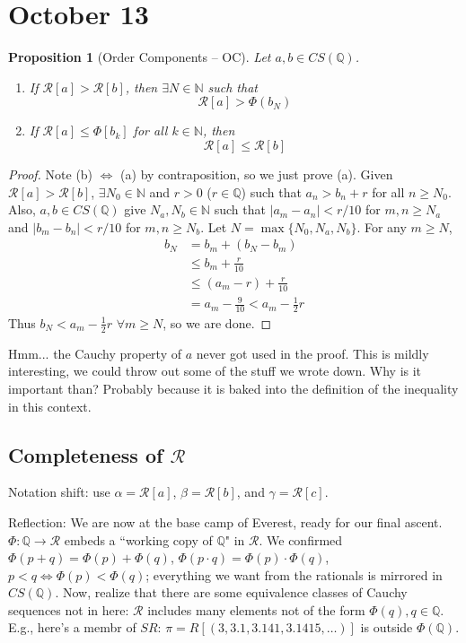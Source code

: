 \documentclass{article}
\theoremstyle{plain}
\newtheorem{proposition}{Proposition}
\theoremstyle{remark}
\newcommand{\N}{{\mathbb N}}
\newcommand{\Q}{{\mathbb Q}}
\newcommand{\SR}{{\mathcal R}}
\begin{document}
\section{October 13}
\begin{proposition}[Order Components -- OC]
	Let $a,b \in CS(\Q)$.
	\begin{enumerate}
		\item If $\SR[a] > \SR[b]$, then $\exists N \in\N$ such that
			\[
				\SR[a] > \Phi(b_N)
			\]
		\item If $\SR[a] \leq \Phi[b_k]$ for all $k \in \N$, then
			\[
				\SR[a] \leq \SR[b]
			\]
	\end{enumerate}
\end{proposition}
\begin{proof}
	Note (b) $\iff$ (a) by contraposition, so we just prove (a).
	Given $\SR[a] > \SR[b]$, $\exists N_0 \in \N$ and $r>0$ ($r \in \Q$)
	such that $a_n > b_n + r$ for all $n\geq N_0$.
	Also, $a,b \in CS(\Q)$ give $N_a,N_b \in \N$ such that
	$|a_m - a_n| < r/10$ for $m,n \geq N_a$ and
	$|b_m - b_n| < r/10$ for $m,n \geq N_b$.
	Let $N = \max\{N_0,N_a,N_b\}$.
	For any $m \geq N$,
	\begin{align*}
		b_N &= b_m + (b_N - b_m)\\
			&\leq b_m + \frac{r}{10}\\
			&\leq (a_m - r) + \frac{r}{10}\\
			&= a_m - \frac{9}{10} < a_m -\frac{1}{2}r
	\end{align*}
	Thus $b_N < a_m - \frac{1}{2}r$ $\forall m \geq N$,
	so we are done.
\end{proof}
Hmm... the Cauchy property of $a$ never got used in the proof.
This is mildly interesting, we could throw out some of the stuff we wrote down.
Why is it important than? Probably because it is baked into the definition
of the inequality in this context.

\subsection{Completeness of $\SR$}
Notation shift: use $\alpha = \SR[a]$, $\beta = \SR[b]$, and $\gamma = \SR[c]$.

Reflection:
We are now at the base camp of Everest, ready for our final ascent.
$\Phi \colon \Q \to \SR$ embeds a ``working copy of $\Q$" in $\SR$.
We confirmed $\Phi(p+q) = \Phi(p) + \Phi(q)$, $\Phi(p\cdot q) = \Phi(p)\cdot\Phi(q)$,
$p < q \iff \Phi(p) < \Phi(q)$;
everything we want from the rationals is mirrored in $CS(\Q)$.
Now, realize that there are some equivalence classes of
Cauchy sequences not in here:
$\SR$ includes many elements not of the form $\Phi(q), q\in\Q$.
E.g., here's a membr of $SR$: $\pi = R[(3,3.1,3.141,3.1415,\dots)]$
is outside $\Phi(\Q)$.
\end{document}
